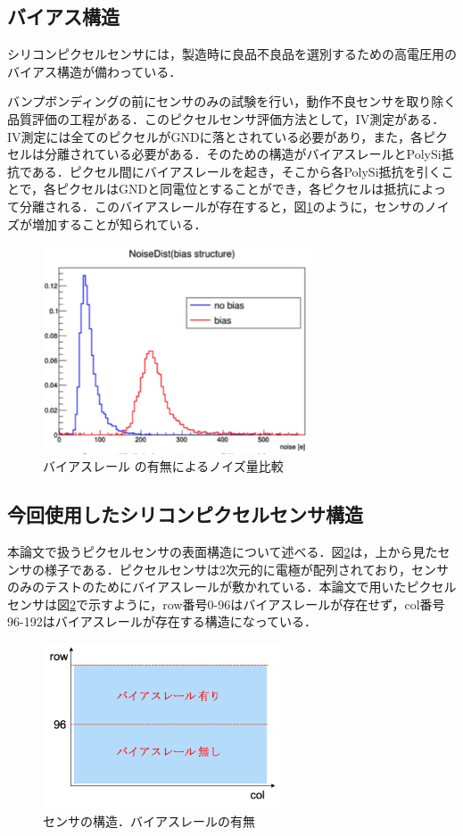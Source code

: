 \subsection{バイアス構造}
シリコンピクセルセンサには，製造時に良品不良品を選別するための高電圧用のバイアス構造が備わっている．\par
バンプボンディングの前にセンサのみの試験を行い，動作不良センサを取り除く品質評価の工程がある．このピクセルセンサ評価方法として，IV測定がある．IV測定には全てのピクセルがGNDに落とされている必要があり，また，各ピクセルは分離されている必要がある．そのための構造がバイアスレールとPolySi抵抗である．ピクセル間にバイアスレールを起き，そこから各PolySi抵抗を引くことで，各ピクセルはGNDと同電位とすることができ，各ピクセルは抵抗によって分離される．このバイアスレールが存在すると，図\ref{fig:bias}のように，センサのノイズが増加することが知られている．
\begin{figure}[h]
  \centering
  \includegraphics[width=8cm]{./figure/noisedist.png}
  \caption{バイアスレール の有無によるノイズ量比較}
  \label{fig:bias}
\end{figure}



\subsection{今回使用したシリコンピクセルセンサ構造}
本論文で扱うピクセルセンサの表面構造について述べる．図\ref{fig:sensor}は，上から見たセンサの様子である．ピクセルセンサは2次元的に電極が配列されており，センサのみのテストのためにバイアスレールが敷かれている．本論文で用いたピクセルセンサは図\ref{fig:sensor}で示すように，row番号0-96はバイアスレールが存在せず，col番号96-192はバイアスレールが存在する構造になっている．

\begin{figure}[h]
  \centering
  \includegraphics[width=7cm]{./figure/sensor.png}
  \caption{センサの構造．バイアスレールの有無}
  \label{fig:sensor}
\end{figure}


